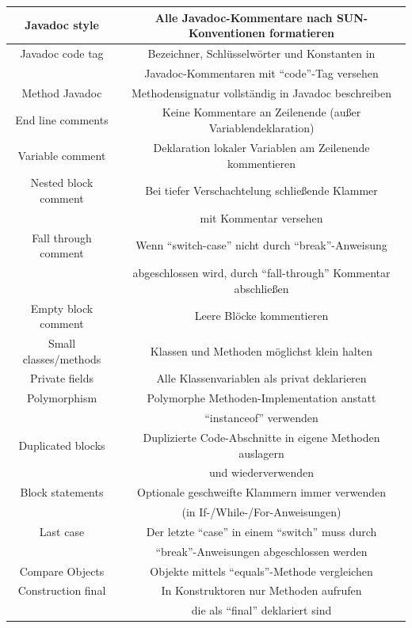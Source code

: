\documentclass[da,ngerman]{stthesis}
\begin{document}
\begin{center}
\begin{longtabu}{|c|c|}
  						\hline
  						Javadoc style & Alle Javadoc-Kommentare nach SUN-Konventionen formatieren \\
  						\hline
  						Javadoc code tag & Bezeichner, Schlüsselwörter und Konstanten in \\ & Javadoc-Kommentaren mit "`code"'-Tag versehen \\
  						\hline 
  						Method Javadoc & Methodensignatur vollständig in Javadoc beschreiben \\
  						\hline
  						End line comments & Keine Kommentare an Zeilenende (außer Variablendeklaration) \\
  						\hline
  						Variable comment & Deklaration lokaler Variablen am Zeilenende kommentieren \\
  						\hline
  						Nested block comment & Bei tiefer Verschachtelung schließende Klammer \\ & mit Kommentar versehen \\
  						\hline
  						Fall through comment & Wenn "`switch-case"' nicht durch "`break"'-Anweisung \\ & abgeschlossen wird, durch "`fall-through"' Kommentar abschließen \\
  						\hline
  						Empty block comment & Leere Blöcke kommentieren \\
  						\hline
  						Small classes/methods & Klassen und Methoden möglichst klein halten \\
  						\hline
  						Private fields & Alle Klassenvariablen als privat deklarieren \\
  						\hline
  						Polymorphism & Polymorphe Methoden-Implementation anstatt \\ & "`instanceof"' verwenden \\
  						\hline
  						Duplicated blocks & Duplizierte Code-Abschnitte in eigene Methoden auslagern \\ & und wiederverwenden \\
  						\hline
  						Block statements & Optionale geschweifte Klammern immer verwenden \\ & (in If-/While-/For-Anweisungen) \\
  						\hline
  						Last case & Der letzte "`case"' in einem "`switch"' muss durch \\ & "`break"'-Anweisungen abgeschlossen werden \\
  						\hline
  						Compare Objects & Objekte mittels "`equals"'-Methode vergleichen \\
  						\hline
  						Construction final & In Konstruktoren nur Methoden aufrufen \\ & die als "`final"' deklariert sind \\

\end{longtabu}
\end{center}
\end{document}
